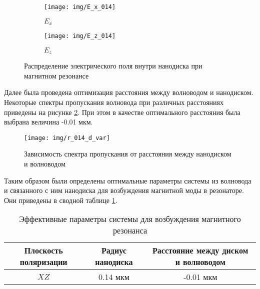 \begin{figure}[H]
	\begin{subfigure}[b]{.5\textwidth}
		\texttt{[image: img/E\_x\_014]}
		\caption{$E_x$}
	\end{subfigure}
	\begin{subfigure}[b]{.5\textwidth}
		\texttt{[image: img/E\_z\_014]}
		\caption{$E_z$}
	\end{subfigure}
	\caption{Распределение электрического поля внутри нанодиска при магнитном резонансе}
	\label{fig:E_reson}
\end{figure}

Далее была проведена оптимизация расстояния между волноводом и нанодиском. Некоторые спектры пропускания волновода при различных расстояниях приведены на рисунке \ref{fig:1x_fixed_r}. При этом в качестве оптимального расстояния была выбрана величина -0.01 мкм.

\begin{figure}[h]
	\centering
	\texttt{[image: img/r\_014\_d\_var]}
	\caption{Зависимость спектра пропускания от расстояния между нанодиском и волноводом}
	\label{fig:1x_fixed_r}
\end{figure}

Таким образом были определены оптимальные параметры системы из волновода и связанного с ним нанодиска для возбуждения магнитной моды в резонаторе. Они приведены в сводной таблице \ref{tbl:effective_params}.

\begin{table}[H]
	\centering
	\begin{tabular}{|c|c|c|}
		\hline
		Плоскость поляризации & Радиус нанодиска & Расстояние между диском и волноводом \\
		\hline
		$XZ$ & 0.14 мкм & -0.01 мкм \\
		\hline
	\end{tabular}
	\caption{Эффективные параметры системы для возбуждения магнитного резонанса}
	\label{tbl:effective_params}
\end{table}
